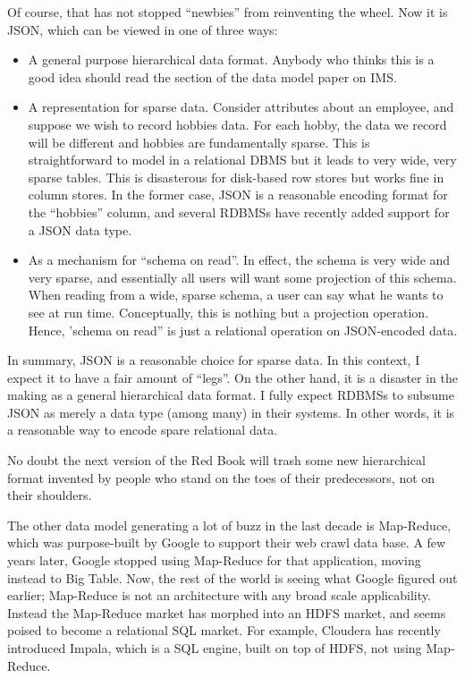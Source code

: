\documentclass[b5paper,11pt,twoside,openright]{book}
\begin{document}
Of course, that has not stopped ``newbies'' from reinventing the wheel.
Now it is JSON, which can be viewed in one of three ways:

\begin{itemize}
  \item
  A general purpose hierarchical data format. Anybody who thinks this is
  a good idea should read the section of the data model paper on IMS.
  \item
  A representation for sparse data. Consider attributes about an
  employee, and suppose we wish to record hobbies data. For each hobby,
  the data we record will be different and hobbies are fundamentally
  sparse. This is straightforward to model in a relational DBMS but it
  leads to very wide, very sparse tables. This is disasterous for
  disk-based row stores but works fine in column stores. In the former
  case, JSON is a reasonable encoding format for the ``hobbies'' column,
  and several RDBMSs have recently added support for a JSON data type.
  \item
  As a mechanism for ``schema on read''. In effect, the schema is very
  wide and very sparse, and essentially all users will want some
  projection of this schema. When reading from a wide, sparse schema, a
  user can say what he wants to see at run time. Conceptually, this is
  nothing but a projection operation. Hence, 'schema on read'' is just a
  relational operation on JSON-encoded data.
\end{itemize}

In summary, JSON is a reasonable choice for sparse data. In this
context, I expect it to have a fair amount of ``legs''. On the other
hand, it is a disaster in the making as a general hierarchical data
format. I fully expect RDBMSs to subsume JSON as merely a data type
(among many) in their systems. In other words, it is a reasonable way to
encode spare relational data.

No doubt the next version of the Red Book will trash some new
hierarchical format invented by people who stand on the toes of their
predecessors, not on their shoulders.

The other data model generating a lot of buzz in the last decade is
Map-Reduce, which was purpose-built by Google to support their web crawl
data base. A few years later, Google stopped using Map-Reduce for that
application, moving instead to Big Table. Now, the rest of the world is
seeing what Google figured out earlier; Map-Reduce is not an
architecture with any broad scale applicability. Instead the Map-Reduce
market has morphed into an HDFS market, and seems poised to become a
relational SQL market. For example, Cloudera has recently introduced
Impala, which is a SQL engine, built on top of HDFS, not using
Map-Reduce.
\end{document}
